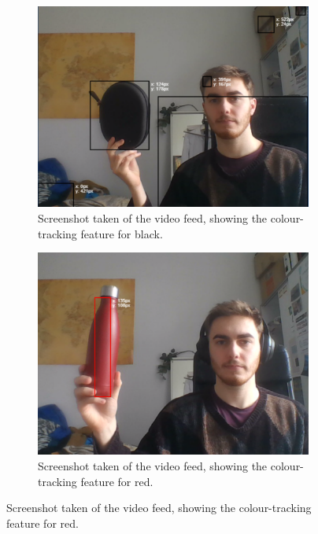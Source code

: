 \documentclass{l4proj}
\begin{document}
\begin{appendices}
\begin{figure}[!ht]
    \centering
    \begin{subfigure}{0.49\textwidth}
        \centering
        \includegraphics[width=\textwidth]{images/colour-tracking-black.pdf}
        \caption{Screenshot taken of the video feed, showing the colour-tracking feature for black.}
        \label{fig:colour-tracking-black} 
    \end{subfigure}
    \begin{subfigure}{0.49\textwidth}
        \centering
        \includegraphics[width=\textwidth]{images/colour-tracking-red.pdf}
        \caption{Screenshot taken of the video feed, showing the colour-tracking feature for red.}
        \label{fig:colour-tracking-red} 

\end{subfigure}
\end{figure}
\end{appendices}
\end{document}
